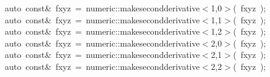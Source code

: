 \documentclass[9pt,onside,a4paper]{article}
\newcommand{\hlstd}[1]{\textcolor[rgb]{0.2,0,0.4}{#1}}
\newcommand{\hlnum}[1]{\textcolor[rgb]{0.2,0.73,0.02}{#1}}
\newcommand{\hlopt}[1]{\textcolor[rgb]{0.33,0.33,0.33}{#1}}
\newcommand{\hlkwb}[1]{\textcolor[rgb]{0.96,0.55,0.14}{#1}}
\newcommand{\hlkwc}[1]{\textcolor[rgb]{0,0,1}{#1}}
\begin{document}
{\hlstd{}\hlstd{\ \ \ \ }\hlstd{}\hlkwc{auto\ }\hlstd{}\hlkwb{const}\hlstd{}\hlopt{\&\ }\hlstd{fxyz\ }\hlopt{=\ }\hlstd{numeric}\hlopt{::}\hlstd{make\textunderscore second\textunderscore derivative}\hlopt{$<$}\hlstd{}\hlnum{1}\hlstd{}\hlopt{,}\hlstd{}\hlnum{0}\hlstd{}\hlopt{$>$(\ }\hlstd{fxyz\ }\hlopt{);}\hspace*{\fill}\\
\hlstd{}\hlstd{\ \ \ \ }\hlstd{}\hlkwc{auto\ }\hlstd{}\hlkwb{const}\hlstd{}\hlopt{\&\ }\hlstd{fxyz\ }\hlopt{=\ }\hlstd{numeric}\hlopt{::}\hlstd{make\textunderscore second\textunderscore derivative}\hlopt{$<$}\hlstd{}\hlnum{1}\hlstd{}\hlopt{,}\hlstd{}\hlnum{1}\hlstd{}\hlopt{$>$(\ }\hlstd{fxyz\ }\hlopt{);}\hspace*{\fill}\\
\hlstd{}\hlstd{\ \ \ \ }\hlstd{}\hlkwc{auto\ }\hlstd{}\hlkwb{const}\hlstd{}\hlopt{\&\ }\hlstd{fxyz\ }\hlopt{=\ }\hlstd{numeric}\hlopt{::}\hlstd{make\textunderscore second\textunderscore derivative}\hlopt{$<$}\hlstd{}\hlnum{1}\hlstd{}\hlopt{,}\hlstd{}\hlnum{2}\hlstd{}\hlopt{$>$(\ }\hlstd{fxyz\ }\hlopt{);}\hspace*{\fill}\\
\hlstd{}\hlstd{\ \ \ \ }\hlstd{}\hlkwc{auto\ }\hlstd{}\hlkwb{const}\hlstd{}\hlopt{\&\ }\hlstd{fxyz\ }\hlopt{=\ }\hlstd{numeric}\hlopt{::}\hlstd{make\textunderscore second\textunderscore derivative}\hlopt{$<$}\hlstd{}\hlnum{2}\hlstd{}\hlopt{,}\hlstd{}\hlnum{0}\hlstd{}\hlopt{$>$(\ }\hlstd{fxyz\ }\hlopt{);}\hspace*{\fill}\\
\hlstd{}\hlstd{\ \ \ \ }\hlstd{}\hlkwc{auto\ }\hlstd{}\hlkwb{const}\hlstd{}\hlopt{\&\ }\hlstd{fxyz\ }\hlopt{=\ }\hlstd{numeric}\hlopt{::}\hlstd{make\textunderscore second\textunderscore derivative}\hlopt{$<$}\hlstd{}\hlnum{2}\hlstd{}\hlopt{,}\hlstd{}\hlnum{1}\hlstd{}\hlopt{$>$(\ }\hlstd{fxyz\ }\hlopt{);}\hspace*{\fill}\\
\hlstd{}\hlstd{\ \ \ \ }\hlstd{}\hlkwc{auto\ }\hlstd{}\hlkwb{const}\hlstd{}\hlopt{\&\ }\hlstd{fxyz\ }\hlopt{=\ }\hlstd{numeric}\hlopt{::}\hlstd{make\textunderscore second\textunderscore derivative}\hlopt{$<$}\hlstd{}\hlnum{2}\hlstd{}\hlopt{,}\hlstd{}\hlnum{2}\hlstd{}\hlopt{$>$(\ }\hlstd{fxyz\ }\hlopt{);}\hspace*{\fill}\\
\hlstd{\hspace*{\fill}\\
}}
\end{document}
